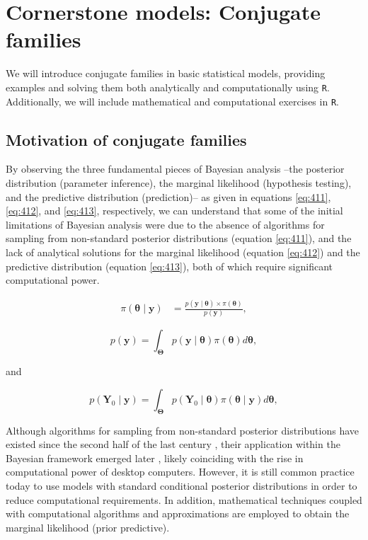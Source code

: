\chapter{Cornerstone models: Conjugate families}\label{chap4}

We will introduce conjugate families in basic statistical models, providing examples and solving them both analytically and computationally using \texttt{R}. Additionally, we will include mathematical and computational exercises in \texttt{R}.

\section{Motivation of conjugate families}\label{sec41}
By observing the three fundamental pieces of Bayesian analysis --the posterior distribution (parameter inference), the marginal likelihood (hypothesis testing), and the predictive distribution (prediction)-- as given in equations \ref{eq:411}, \ref{eq:412}, and \ref{eq:413}, respectively, we can understand that some of the initial limitations of Bayesian analysis were due to the absence of algorithms for sampling from non-standard posterior distributions (equation \ref{eq:411}), and the lack of analytical solutions for the marginal likelihood (equation \ref{eq:412}) and the predictive distribution (equation \ref{eq:413}), both of which require significant computational power.


\begin{align}
	\pi(\bm{\theta}\mid \bm{y})&=\frac{p(\bm{y}\mid \bm{\theta}) \times \pi(\bm{\theta})}{p(\bm{y})},
	\label{eq:411}
\end{align}

\begin{equation}
	p(\bm{y})=\int_{\bm{\Theta}}p(\bm{y}\mid \bm{\theta})\pi(\bm{\theta})d\bm{\theta},
	\label{eq:412}
\end{equation}

and 

\begin{equation}
	p(\bm{Y}_0\mid \bm{y})=\int_{\bm{\Theta}}p(\bm{Y}_0\mid \bm{\theta})\pi(\bm{\theta}\mid \bm{y})d\bm{\theta},
	\label{eq:413}
\end{equation}

Although algorithms for sampling from non-standard posterior distributions have existed since the second half of the last century \cite{metropolis53,hastings70,Geman1984}, their application within the Bayesian framework emerged later \cite{Gelfand1990,tierney1994markov}, likely coinciding with the rise in computational power of desktop computers. However, it is still common practice today to use models with standard conditional posterior distributions in order to reduce computational requirements. In addition, mathematical techniques coupled with computational algorithms \cite{gelfand1994bayesian, chib1995marginal, chib2001marginal} and approximations \cite{Tierney1986,Jordan1999} are employed to obtain the marginal likelihood (prior predictive).

